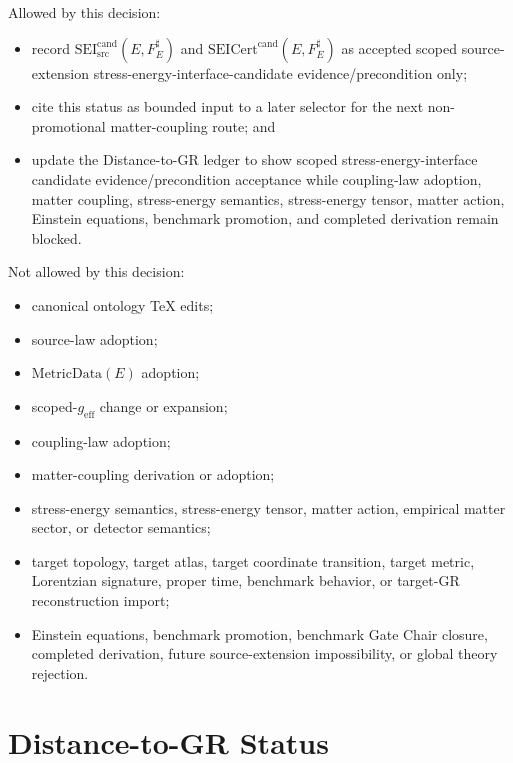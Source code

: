 \documentclass[11pt]{article}
\newcommand{\MetricData}{\mathrm{MetricData}}
\newcommand{\geff}{g_{\mathrm{eff}}}
\newcommand{\SEICand}{\mathrm{SEI}_{\mathrm{src}}^{\mathrm{cand}}}
\newcommand{\SEICertCand}{\mathrm{SEICert}^{\mathrm{cand}}}
\begin{document}
Allowed by this decision:
\begin{itemize}[leftmargin=*]
  \item record \(\SEICand(E,F_E^\sharp)\) and
  \(\SEICertCand(E,F_E^\sharp)\) as accepted scoped source-extension
  stress-energy-interface-candidate evidence/precondition only;
  \item cite this status as bounded input to a later selector for the next
  non-promotional matter-coupling route; and
  \item update the Distance-to-GR ledger to show scoped stress-energy-interface
  candidate evidence/precondition acceptance while coupling-law adoption,
  matter coupling, stress-energy semantics, stress-energy tensor, matter
  action, Einstein equations, benchmark promotion, and completed derivation
  remain blocked.
\end{itemize}

Not allowed by this decision:
\begin{itemize}[leftmargin=*]
  \item canonical ontology TeX edits;
  \item source-law adoption;
  \item \(\MetricData(E)\) adoption;
  \item scoped-\(\geff\) change or expansion;
  \item coupling-law adoption;
  \item matter-coupling derivation or adoption;
  \item stress-energy semantics, stress-energy tensor, matter action,
  empirical matter sector, or detector semantics;
  \item target topology, target atlas, target coordinate transition, target
  metric, Lorentzian signature, proper time, benchmark behavior, or target-GR
  reconstruction import;
  \item Einstein equations, benchmark promotion, benchmark Gate Chair closure,
  completed derivation, future source-extension impossibility, or global
  theory rejection.
\end{itemize}

\section{Distance-to-GR Status}
\end{document}
